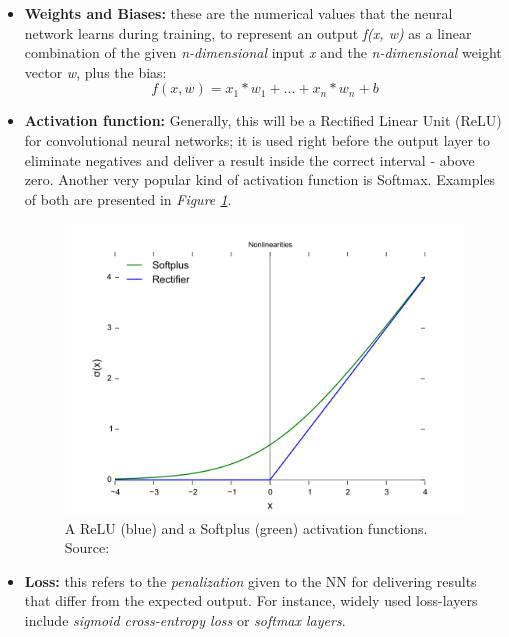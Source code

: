 \begin{itemize}
    \item \textbf{Weights and Biases:} these are the numerical values that the neural network learns during training, to represent an output \textit{f(x, w)} as a linear combination of the given \textit{n-dimensional} input \textit{x} and the \textit{n-dimensional} weight vector \textit{w}, plus the bias:
    \begin{equation}
        f(x, w) = x_1*w_1 + ... + x_n*w_n + b
    \end{equation}
    \item \textbf{Activation function:} Generally, this will be a Rectified Linear Unit (ReLU) for convolutional neural networks; it is used right before the output layer to eliminate negatives and deliver a result inside the correct interval - above zero. Another very popular kind of activation function is Softmax. Examples of both are presented in \textit{Figure \ref{fig:relu_softplus}}. \cite{activations}
    \begin{figure}
        \centering
        \includegraphics[width = 12 cm]{images/1280px-Rectifier_and_softplus_functions.svg.png}
        \caption{A ReLU (blue) and a Softplus (green) activation functions. Source: \cite{activations_figure}}
        \label{fig:relu_softplus}
    \end{figure}
    \item \textbf{Loss:} this refers to the \textit{penalization} given to the NN for delivering results that differ from the expected output. For instance, widely used loss-layers include \textit{sigmoid cross-entropy loss} or \textit{softmax layers}.
\end{itemize}

